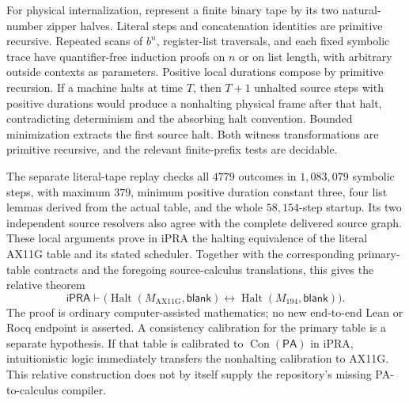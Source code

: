 For physical internalization, represent a finite binary tape by its two
natural-number zipper halves. Literal steps and concatenation identities
are primitive recursive. Repeated scans of $b^n$, register-list traversals,
and each fixed symbolic trace have quantifier-free induction proofs on
$n$ or on list length, with arbitrary outside contexts as parameters.
Positive local durations compose by primitive recursion. If a machine
halts at time $T$, then $T+1$ unhalted source steps with positive durations
would produce a nonhalting physical frame after that halt, contradicting
determinism and the absorbing halt convention. Bounded minimization
extracts the first source halt. Both witness transformations are primitive
recursive, and the relevant finite-prefix tests are decidable.

The separate literal-tape replay checks all $4779$ outcomes in
$1,083,079$ symbolic steps, with maximum $379$, minimum positive duration
constant three, four list lemmas derived from the actual table, and the
whole $58,154$-step startup. Its two independent source resolvers also
agree with the complete delivered source graph. These local arguments prove in iPRA the halting equivalence of the literal
AX11G table and its stated scheduler. Together with the corresponding
primary-table contracts and the foregoing source-calculus translations,
this gives the relative theorem
\[
 \mathsf{iPRA}\vdash
 \bigl(\operatorname{Halt}(M_{\mathrm{AX11G}},\mathsf{blank})
   \leftrightarrow\operatorname{Halt}(M_{194},\mathsf{blank})\bigr).
\]
The proof is ordinary computer-assisted mathematics; no new end-to-end
Lean or Rocq endpoint is asserted. A consistency calibration for the
primary table is a separate hypothesis. If that table is calibrated to
$\operatorname{Con}(\mathsf{PA})$ in iPRA, intuitionistic logic immediately
transfers the nonhalting calibration to AX11G. This relative construction
does not by itself supply the repository's missing PA-to-calculus compiler.
